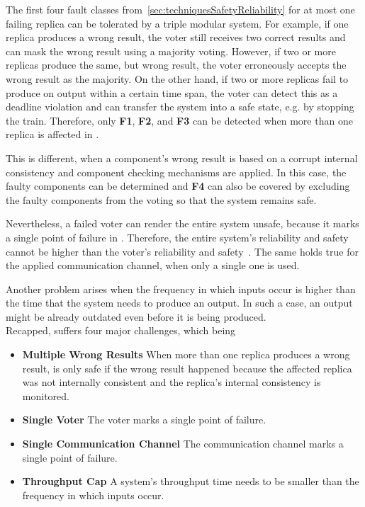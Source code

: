 The first four fault classes from~\autoref{sec:techniquesSafetyReliability} for at most one failing replica can be tolerated by a triple modular system.
For example, if one replica produces a wrong result, the voter still receives two correct results and can mask the wrong result using a majority voting.
However, if two or more replicas produce the same, but wrong result, the voter erroneously accepts the wrong result as the majority.
On the other hand, if two or more replicas fail to produce on output within a certain time span, the voter can detect this as a deadline violation and can transfer the system into a safe state, e.g. by stopping the train.
Therefore, only \textbf{F1}, \textbf{F2}, and \textbf{F3} can be detected when more than one replica is affected in .

This is different, when a component's wrong result is based on a corrupt internal consistency and component checking mechanisms are applied.
In this case, the faulty components can be determined and \textbf{F4} can also be covered by excluding the faulty components from the voting so that the system remains safe.

Nevertheless, a failed voter can render the entire system unsafe, because it marks a single point of failure in .
Therefore, the entire system's reliability and safety cannot be higher than the voter's reliability and safety~\cite{ArifeenFaultTolerantTMR}.
The same holds true for the applied communication channel, when only a single one is used.

Another problem arises when the frequency in which inputs occur is higher than the time that the system needs to produce an output.
In such a case, an output might be already outdated even before it is being produced.
\\

Recapped,  suffers four major challenges, which being

\newcommand{\ChallengeWR}{\textbf{Multiple Wrong Results}\xspace}
\newcommand{\ChallengeVoter}{\textbf{Single Voter}\xspace}
\newcommand{\ChallengeComm}{\textbf{Single Communication Channel}\xspace}
\newcommand{\ChallengeThrough}{\textbf{Throughput Cap}\xspace}
\begin{itemize}
\item \ChallengeWR When more than one replica produces a wrong result,  is only safe if the wrong result happened because the affected replica was not internally consistent and the replica's internal consistency is monitored.
\item \ChallengeVoter The voter marks a single point of failure.
\item \ChallengeComm The communication channel marks a single point of failure.
\item \ChallengeThrough A system's throughput time needs to be smaller than the frequency in which inputs occur.
\end{itemize}

